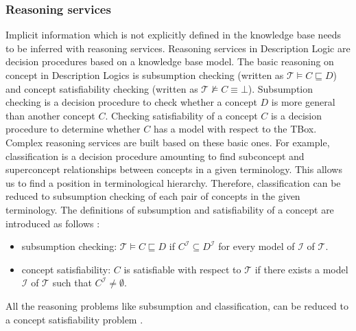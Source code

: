 \documentclass{article}
\begin{document}
\subsubsection{Reasoning services}
Implicit information which is not explicitly defined in the knowledge base needs to be inferred with reasoning services.
Reasoning services in Description Logic are decision procedures based on a knowledge base model. 
The basic reasoning on concept in Description Logics is subsumption checking (written as $\mathcal{T}\vDash C\sqsubseteq D$) and 
concept satisfiability checking (written as $\mathcal{T}\nvDash C\equiv \bot$).
Subsumption checking is a decision procedure to check whether a concept $D$ is more general than another concept $C$.
Checking satisfiability of a concept $C$ is a decision procedure to determine whether $C$ has a model with respect to the TBox.
Complex reasoning services are built based on these basic ones. For example, classification is a decision procedure amounting to find subconcept and superconcept 
relationships between concepts in a given terminology. This allows us to find a position in terminological hierarchy.
Therefore, classification can be reduced to subsumption checking of each pair of concepts in the given terminology.
The definitions of subsumption and satisfiability of a concept are introduced as follows \cite{baader2003description}:
\begin{itemize}
\item subsumption checking: $\mathcal{T}\vDash C\sqsubseteq D$ if $C^\mathcal{I}\subseteq D^\mathcal{I}$ for every model of $\mathcal{I}$ of $\mathcal{T}$.
\item concept satisfiability: $C$ is satisfiable with respect to $\mathcal{T}$ if there exists a model $\mathcal{I}$ of $\mathcal{T}$ such that $C^\mathcal{I}\neq \emptyset$.
\end{itemize}
All the reasoning problems like subsumption and classification, can be reduced to a concept satisfiability problem \cite{baader2003description}.
\end{document}
